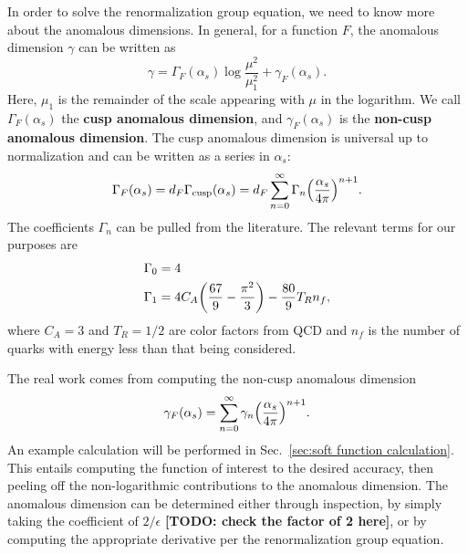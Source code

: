 \documentclass[12pt,twoside,class=../reedthesis, crop=false]{standalone}
\providecommand{\cusp}{\mathrm{cusp}}
\begin{document}
	In order to solve the renormalization group equation, we need to know more about the anomalous dimensions. In general, for a function $F$, the anomalous dimension $\gamma$ can be written as \cite{frye_factorization_2016}
	\begin{equation}
		\gamma = \Gamma_F(\alpha_s) \log\frac{\mu^2}{\mu_1^2} + \gamma_F(\alpha_s).
	\end{equation}
	Here, $\mu_1$ is the remainder of the scale appearing with $\mu$ in the logarithm. We call $\Gamma_F(\alpha_s)$ the \textbf{cusp anomalous dimension}, and $\gamma_F(\alpha_s)$ is the \textbf{non-cusp anomalous dimension}. The cusp anomalous dimension is universal up to normalization and can be written as a series in $\alpha_s$:
	\begin{equation}
		\Gamma_F(\alpha_s) = d_F \Gamma_\cusp(\alpha_s) = d_F \sum_{n = 0}^\infty \Gamma_n \qty(\frac{\alpha_s}{4\pi})^{n + 1}.
	\end{equation}
	The coefficients $\Gamma_n$ can be pulled from the literature. The relevant terms for our purposes are \cite{frye_factorization_2016}
	\begin{equation}
	\begin{aligned}
		\Gamma_0 &= 4 \\
		\Gamma_1 &= 4C_A \qty(\frac{67}{9} - \frac{\pi^2}{3}) - \frac{80}{9}T_R n_f,
	\end{aligned}
	\end{equation}
	where $C_A = 3$ and $T_R = 1/2$ are color factors from QCD and $n_f$ is the number of quarks with energy less than that being considered.

	The real work comes from computing the non-cusp anomalous dimension
	\begin{equation}
		\gamma_F(\alpha_s) = \sum_{n = 0}^\infty \gamma_n \qty(\frac{\alpha_s}{4\pi})^{n + 1}.
	\end{equation}
	An example calculation will be performed in Sec.~\ref{sec:soft function calculation}. This entails computing the function of interest to the desired accuracy, then peeling off the non-logarithmic contributions to the anomalous dimension. The anomalous dimension can be determined either through inspection, by simply taking the coefficient of $2/\epsilon$ {\color{red}\textbf{[TODO: check the factor of 2 here]}}, or by computing the appropriate derivative per the renormalization group equation.
\end{document}
